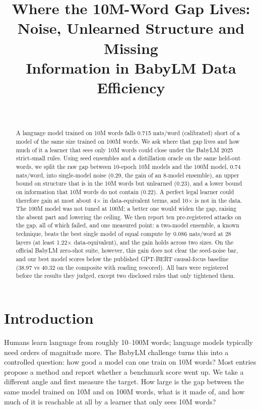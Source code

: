 \documentclass[11pt]{article}
\title{Where the 10M-Word Gap Lives: Noise, Unlearned Structure and Missing\\ Information in BabyLM Data Efficiency}
\author{\paperauthor \\ \paperaffil}
\begin{document}
\maketitle

\begin{abstract}
A language model trained on 10M words falls 0.715 nats/word (calibrated) short of a model of the same size trained on
100M words. We ask where that gap lives and how much of it a learner that sees only 10M words could close under the
BabyLM 2025 strict-small rules. Using seed ensembles and a distillation oracle on the same held-out words, we split the
raw gap between 10-epoch 10M models and the 100M model, 0.74 nats/word, into single-model noise (0.29, the gain of an
8-model ensemble), an upper bound on structure that is in the 10M words but unlearned (0.23), and a lower bound on
information that 10M words do not contain (0.22). A perfect legal learner could therefore gain at most about 4$\times$
in data-equivalent terms, and 10$\times$ is not in the data. The 100M model was not tuned at 100M; a better one would
widen the gap, raising the absent part and lowering the ceiling. We then report ten pre-registered attacks on the gap,
all of which failed, and one measured point: a two-model ensemble, a known technique, beats the best single model of
equal compute by 0.086 nats/word at 28 layers (at least 1.22$\times$ data-equivalent), and the gain holds across two
sizes. On the official BabyLM zero-shot suite, however, this gain does not clear the seed-noise bar, and our best model
scores below the published GPT-BERT causal-focus baseline (38.97 vs 40.32 on the composite with reading rescored). All
bars were registered before the results they judged, except two disclosed rules that only tightened them.
\end{abstract}

\section{Introduction}
Humans learn language from roughly 10--100M words; language models typically need orders of magnitude more. The BabyLM
challenge \citep{babylm2025} turns this into a controlled question: how good a model can one train on 10M words? Most
entries propose a method and report whether a benchmark score went up. We take a different angle and first measure the
target. How large is the gap between the same model trained on 10M and on 100M words, what is it made of, and how much of it is
reachable at all by a learner that only sees 10M words?
\end{document}
